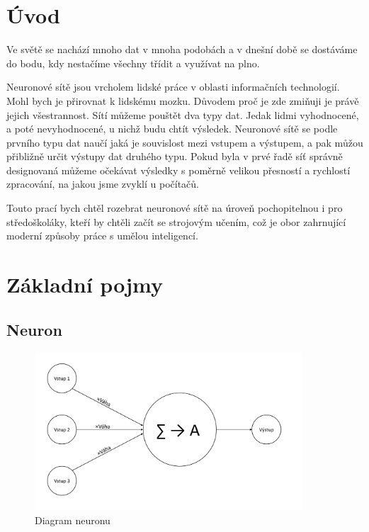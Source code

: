 \documentclass[12pt,a4paper]{report}
\begin{document}


\tableofcontents

\chapter{Úvod}
Ve světě se nachází mnoho dat v mnoha podobách a v dnešní době se dostáváme do bodu, kdy nestačíme všechny třídit a využívat na plno.

Neuronové sítě jsou vrcholem lidské práce v oblasti informačních technologií. Mohl bych je přirovnat k lidskému mozku. Důvodem proč je zde zmiňuji je právě jejich všestrannost. Sítí můžeme pouštět dva typy dat. Jedak lidmi vyhodnocené, a poté nevyhodnocené, u nichž budu chtít výsledek. Neuronové sítě se podle prvního typu dat naučí jaká je souvislost mezi vstupem a výstupem, a pak můžou přibližně určit výstupy dat druhého typu. Pokud byla v prvé řadě síť správně designovaná můžeme očekávat výsledky s poměrně velikou přesností a rychlostí zpracování, na jakou jsme zvyklí u počítačů.

Touto prací bych chtěl rozebrat neuronové sítě na úroveň pochopitelnou i pro středoškoláky, kteří by chtěli začít se strojovým učením, což je obor zahrnující moderní způsoby práce s umělou inteligencí.

\chapter{Základní pojmy} %

\section{Neuron}
	\begin{figure}[h]
		\centering
		\includegraphics[width=10cm]{images/neuron}
		\caption{Diagram neuronu}
	\end{figure}
\end{document}
